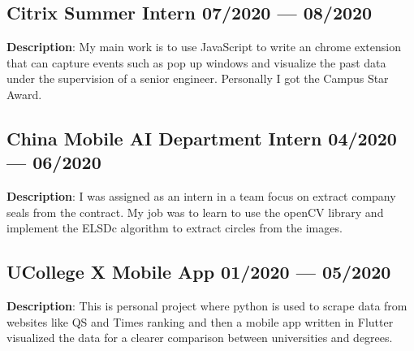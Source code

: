 \subsection{{Citrix Summer Intern
    \hfill 07/2020 --- 08/2020}}
\begin{zitemize}
    \item \textbf{Description}: My main work is to use JavaScript to write an
        chrome extension that can capture events such as pop up windows
        and visualize the past data under the supervision of a senior engineer.
        Personally I got the Campus Star Award.
\end{zitemize}

\subsection{{China Mobile AI Department Intern
    \hfill 04/2020 --- 06/2020}}
\begin{zitemize}
    \item \textbf{Description}: I was assigned as an intern in a team focus on
        extract company seals from the contract. My job was to learn to use the
        openCV library and implement the ELSDc algorithm to extract circles
        from the images.
\end{zitemize}

\subsection{{UCollege X Mobile App
    \hfill 01/2020 --- 05/2020}}
\begin{zitemize}
    \item \textbf{Description}: This is personal project where python is used
        to scrape data from websites like QS and Times ranking and then a mobile
        app written in Flutter visualized the data for a clearer comparison 
        between universities and degrees.
\end{zitemize}
